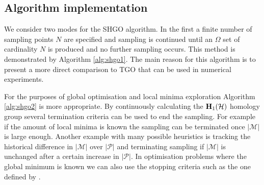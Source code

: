 





\subsection{Algorithm implementation}
We consider two modes for the SHGO algorithm. In the first a finite number of sampling points $N$ are specified and sampling is continued until an $\Omega$ set of cardinality $N$ is produced and no further sampling occurs. This method is demonstrated by Algorithm \ref{alg:shgo1}. The main reason for this algorithm is to present a more direct comparison to TGO that can be used in numerical experiments.%

For the purposes of global optimisation and local minima exploration Algorithm \ref{alg:shgo2} is more appropriate. By continuously calculating the $\bold{H}_1 (\mathcal{H})$ homology group several termination criteria can be used to end the sampling. For example if the amount of local minima is known the sampling can be terminated once $|\mathcal{M}|$ is large enough. Another example with many possible heuristics is tracking the historical difference in $|\mathcal{M}|$ over $|\mathcal{P}|$ and terminating sampling if $|\mathcal{M}|$ is unchanged after a certain increase in $|\mathcal{P}|$. In optimisation problems where the global minimum is known we can also use the stopping criteria such as the one defined by \cite{Paul2016} . 

